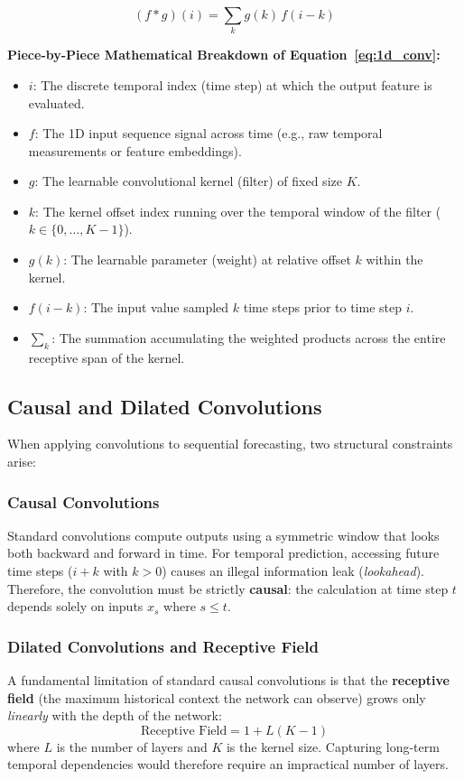 \begin{equation}
(f * g)(i) = \sum_{k} g(k) \, f(i - k)
\label{eq:1d_conv}
\end{equation}

\begin{Notebox}
\textbf{Piece-by-Piece Mathematical Breakdown of Equation~\ref{eq:1d_conv}:}
\begin{itemize}[nosep, leftmargin=*]
    \item $i$: The discrete temporal index (time step) at which the output feature is evaluated.
    \item $f$: The 1D input sequence signal across time (e.g., raw temporal measurements or feature embeddings).
    \item $g$: The learnable convolutional kernel (filter) of fixed size $K$.
    \item $k$: The kernel offset index running over the temporal window of the filter ($k \in \{0, \dots, K-1\}$).
    \item $g(k)$: The learnable parameter (weight) at relative offset $k$ within the kernel.
    \item $f(i - k)$: The input value sampled $k$ time steps prior to time step $i$.
    \item $\sum_k$: The summation accumulating the weighted products across the entire receptive span of the kernel.
\end{itemize}
\end{Notebox}

\subsection{Causal and Dilated Convolutions}

When applying convolutions to sequential forecasting, two structural constraints arise:

\subsubsection{Causal Convolutions}
Standard convolutions compute outputs using a symmetric window that looks both backward and forward in time. For temporal prediction, accessing future time steps ($i+k$ with $k > 0$) causes an illegal information leak (\textit{lookahead}). Therefore, the convolution must be strictly \textbf{causal}: the calculation at time step $t$ depends solely on inputs $x_s$ where $s \le t$.

\subsubsection{Dilated Convolutions and Receptive Field}
A fundamental limitation of standard causal convolutions is that the \textbf{receptive field} (the maximum historical context the network can observe) grows only \textit{linearly} with the depth of the network:
\[ \text{Receptive Field} = 1 + L(K - 1) \]
where $L$ is the number of layers and $K$ is the kernel size. Capturing long-term temporal dependencies would therefore require an impractical number of layers.

